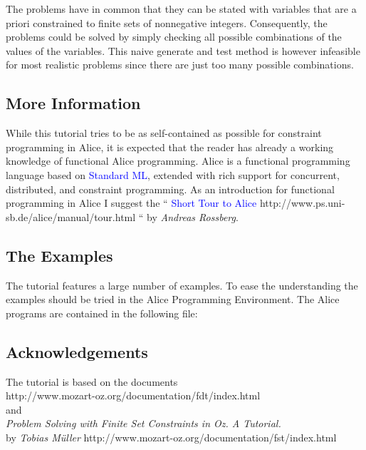 \documentclass[a4paper,halfparskip]{scrartcl}
\begin{document}
The problems have in common that they can be stated with variables 
that are a priori 
constrained to finite sets of nonnegative integers. Consequently, 
the problems could be 
solved by simply checking all possible combinations of the values 
of the variables. This naive 
generate and test method is however infeasible for most realistic 
problems since there are just 
too many possible combinations.


\subsection{More Information}

While this tutorial tries to be as self-contained as possible for 
constraint programming in Alice, 
it is expected that the reader has already a working knowledge of
functional Alice programming. Alice is a functional programming
language based on \textcolor{blue}{Standard ML}, extended with rich
support for concurrent, distributed, and constraint programming.
As an introduction for functional programming in Alice I suggest the 
\cite{4} ``\htmladdnormallink
{\textcolor{blue}{Short Tour to Alice}}
{http://www.ps.uni-sb.de/alice/manual/tour.html}
`` by \emph{Andreas Rossberg}.

\subsection{The Examples}

The tutorial features a large number of examples. To ease the 
understanding the examples should 
be tried in the Alice Programming Environment. The Alice 
programs are contained in the following 
file: 

\subsection{Acknowledgements}

The tutorial is based on the documents\\
{http://www.mozart-oz.org/documentation/fdt/index.html} 
\\ 
and\\
\htmladdnormallink
{\cite{2} \emph{Problem Solving with 
Finite Set Constraints in Oz. A Tutorial.} \\
by \emph{Tobias M\"uller}}
{http://www.mozart-oz.org/documentation/fst/index.html}
\end{document}
